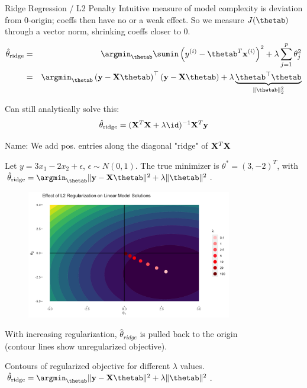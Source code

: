 \documentclass[11pt,compress,t,notes=noshow, xcolor=table]{beamer}
\begin{document}
\begin{vbframe}{Ridge Regression / L2 Penalty}
Intuitive measure of model complexity is deviation from 0-origin; coeffs then have no or a weak effect. 
So we measure $J(\thetab)$ through a vector norm, shrinking coeffs closer to 0.\\
\vspace{0.2cm}
\begin{eqnarray*}  
\thetah_{\text{ridge}} &=& \argmin_{\thetab} \sumin \left(\yi - \thetab^T \xi \right)^2 + \lambda \sum_{j=1}^{p} \theta_j^2 \\
&=& \argmin_{\thetab} \left(\yv - \Xmat \thetab\right)^\top \left(\yv - \Xmat \thetab\right) + \lambda \underbrace{\thetab^\top \thetab}_{\|\thetab\|_2^2}
\end{eqnarray*}

Can still analytically solve this:
$$\thetah_{\text{ridge}} = ({\Xmat}^T \Xmat  + \lambda \id)^{-1} \Xmat^T\yv$$

Name: We add pos. entries along the diagonal "ridge" of $\mathbf{X}^T \mathbf{X}$

\framebreak 

Let $y=3x_{1} -2x_{2} +\epsilon $, $ \epsilon \sim N( 0,1)$. The true minimizer is $\theta ^{*} =( 3,-2)^{T}$, with $ \thetah_{\text{ridge}} = \argmin_{\thetab} \|\yv - \Xmat \thetab\|^2 + \lambda \|\thetab\|^2 $.

\begin{figure}
\includegraphics[width=0.8\textwidth]{figure/lin_reg_l2.png}
\end{figure}
\vspace{-0.2cm}
{\small With increasing regularization, $\hat{\theta}_{\textit{ridge}}$ is pulled back to the origin\\ (contour lines show unregularized objective).}

\framebreak 
Contours of regularized objective for different $\lambda$ values.\\
$ \thetah_{\text{ridge}} = \argmin_{\thetab} \|\yv - \Xmat \thetab\|^2 + \lambda \|\thetab\|^2 $.


\end{vbframe}
\end{document}
